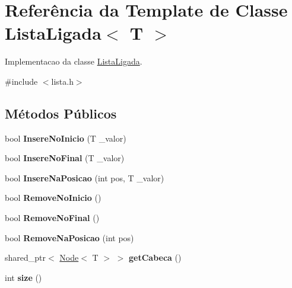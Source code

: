 \hypertarget{classListaLigada}{}\section{Referência da Template de Classe Lista\+Ligada$<$ T $>$}
\label{classListaLigada}


Implementacao da classe \hyperlink{classListaLigada}{Lista\+Ligada}.  




{\ttfamily \#include $<$lista.\+h$>$}

\subsection*{Métodos Públicos}
\begin{DoxyCompactItemize}
\item 
bool {\bfseries Insere\+No\+Inicio} (T \+\_\+valor)\hypertarget{classListaLigada_ae5c528807334f89f5fa34beab6cccebf}{}\label{classListaLigada_ae5c528807334f89f5fa34beab6cccebf}

\item 
bool {\bfseries Insere\+No\+Final} (T \+\_\+valor)\hypertarget{classListaLigada_a0a7a7ca52d16deda399c51e9c32aa167}{}\label{classListaLigada_a0a7a7ca52d16deda399c51e9c32aa167}

\item 
bool {\bfseries Insere\+Na\+Posicao} (int pos, T \+\_\+valor)\hypertarget{classListaLigada_ae42913bdf31cb66ab4a0eec0e207e843}{}\label{classListaLigada_ae42913bdf31cb66ab4a0eec0e207e843}

\item 
bool {\bfseries Remove\+No\+Inicio} ()\hypertarget{classListaLigada_a96e263fe9ff0385719a67680d2d9eadc}{}\label{classListaLigada_a96e263fe9ff0385719a67680d2d9eadc}

\item 
bool {\bfseries Remove\+No\+Final} ()\hypertarget{classListaLigada_a48a1b9c8e883f6db2e0d68cfd18e0793}{}\label{classListaLigada_a48a1b9c8e883f6db2e0d68cfd18e0793}

\item 
bool {\bfseries Remove\+Na\+Posicao} (int pos)\hypertarget{classListaLigada_a5e47ccba3363b97c6223d8867f18bbf7}{}\label{classListaLigada_a5e47ccba3363b97c6223d8867f18bbf7}

\item 
shared\+\_\+ptr$<$ \hyperlink{classNode}{Node}$<$ T $>$ $>$ {\bfseries get\+Cabeca} ()\hypertarget{classListaLigada_ad9914db162e92689debeda14f0b671da}{}\label{classListaLigada_ad9914db162e92689debeda14f0b671da}

\item 
int {\bfseries size} ()\hypertarget{classListaLigada_aaa0fe8d3ea92daa521f97d5aa1936ae6}{}\label{classListaLigada_aaa0fe8d3ea92daa521f97d5aa1936ae6}

\end{DoxyCompactItemize}
